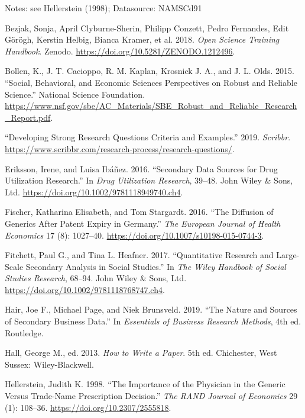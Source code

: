 \documentclass[
]{book}
\begin{document}
Notes: see Hellerstein (1998); Datasource: NAMSCd91

\hypertarget{refs}{}
\leavevmode\hypertarget{ref-bezjak_open_2018}{}%
Bezjak, Sonja, April Clyburne-Sherin, Philipp Conzett, Pedro Fernandes,
Edit Görögh, Kerstin Helbig, Bianca Kramer, et al. 2018. \emph{Open
Science Training Handbook}. Zenodo.
\url{https://doi.org/10.5281/ZENODO.1212496}.

\leavevmode\hypertarget{ref-bollen_social_2015}{}%
Bollen, K., J. T. Cacioppo, R. M. Kaplan, Krosnick J. A., and J. L.
Olds. 2015. ``Social, Behavioral, and Economic Sciences Perspectives on
Robust and Reliable Science.'' National Science Foundation.
\url{https://www.nsf.gov/sbe/AC_Materials/SBE_Robust_and_Reliable_Research_Report.pdf}.

\leavevmode\hypertarget{ref-noauthor_developing_2019}{}%
``Developing Strong Research Questions Criteria and Examples.'' 2019.
\emph{Scribbr}.
\url{https://www.scribbr.com/research-process/research-questions/}.

\leavevmode\hypertarget{ref-eriksson_secondary_2016}{}%
Eriksson, Irene, and Luisa Ibáñez. 2016. ``Secondary Data Sources for
Drug Utilization Research.'' In \emph{Drug Utilization Research},
39--48. John Wiley \& Sons, Ltd.
\url{https://doi.org/10.1002/9781118949740.ch4}.

\leavevmode\hypertarget{ref-fischer_diffusion_2016}{}%
Fischer, Katharina Elisabeth, and Tom Stargardt. 2016. ``The Diffusion
of Generics After Patent Expiry in Germany.'' \emph{The European Journal
of Health Economics} 17 (8): 1027--40.
\url{https://doi.org/10.1007/s10198-015-0744-3}.

\leavevmode\hypertarget{ref-fitchett_quantitative_2017}{}%
Fitchett, Paul G., and Tina L. Heafner. 2017. ``Quantitative Research
and Large-Scale Secondary Analysis in Social Studies.'' In \emph{The
Wiley Handbook of Social Studies Research}, 68--94. John Wiley \& Sons,
Ltd. \url{https://doi.org/10.1002/9781118768747.ch4}.

\leavevmode\hypertarget{ref-hair_nature_2019}{}%
Hair, Joe F., Michael Page, and Niek Brunsveld. 2019. ``The Nature and
Sources of Secondary Business Data.'' In \emph{Essentials of Business
Research Methods}, 4th ed. Routledge.

\leavevmode\hypertarget{ref-hall_how_2013}{}%
Hall, George M., ed. 2013. \emph{How to Write a Paper}. 5th ed.
Chichester, West Sussex: Wiley-Blackwell.

\leavevmode\hypertarget{ref-hellerstein_importance_1998}{}%
Hellerstein, Judith K. 1998. ``The Importance of the Physician in the
Generic Versus Trade-Name Prescription Decision.'' \emph{The RAND
Journal of Economics} 29 (1): 108--36.
\url{https://doi.org/10.2307/2555818}.
\end{document}
